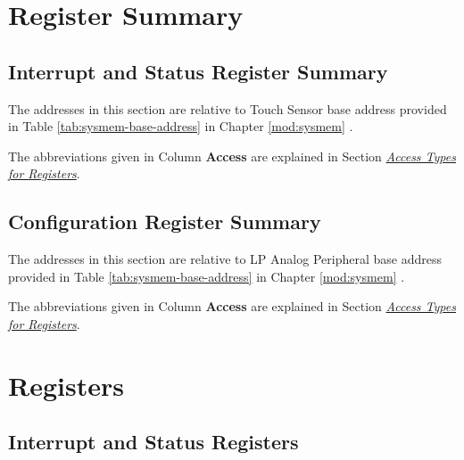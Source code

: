 \documentclass[main\_\_EN.tex]{subfiles}
\begin{document}

\newpage
\begin{landscape}
\hypertarget{tchsen-reg-summ}{}
\section{Register Summary}
\label{sec:tchsen-reg-summ}

\subsection{Interrupt and Status Register Summary}
\label{sec:tchsen-status-reg-summ}

The addresses in this section are relative to Touch Sensor base address provided in Table \ref{tab:sysmem-base-address} in Chapter \ref{mod:sysmem} \textit{}.

The abbreviations given in Column \textbf{Access} are explained in Section \hyperref[glossary-access-types]{\textit{Access Types for Registers}}.



\subsection{Configuration Register Summary}
\label{sec:tchsen-config-reg-summ}

The addresses in this section are relative to LP Analog Peripheral base address provided in Table \ref{tab:sysmem-base-address} in Chapter \ref{mod:sysmem} \textit{}.

The abbreviations given in Column \textbf{Access} are explained in Section \hyperref[glossary-access-types]{\textit{Access Types for Registers}}.


\end{landscape}




\newpage
\section{Registers}

\subsection{Interrupt and Status Registers}
\label{sec:tchsen-status-reg}
\end{document}
